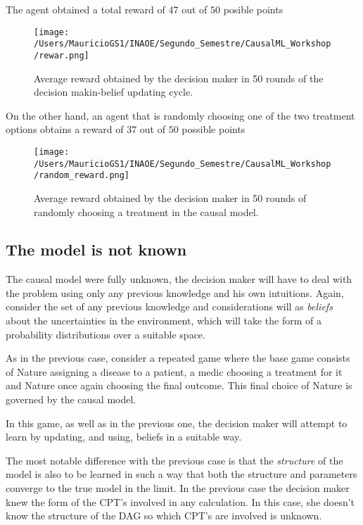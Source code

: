 \documentclass{article}
\begin{document}
The agent obtained a total reward of $47$ out of $50$ posible points
\begin{figure}[ht]
\vskip 0.2in
\begin{center}
\centerline{\texttt{[image: /Users/MauricioGS1/INAOE/Segundo\_Semestre/CausalML\_Workshop/rewar.png]}}
\caption{Average reward obtained by the decision maker in 50 rounds of the decision makin-belief updating cycle.}
\label{average_reward}
\end{center}
\vskip -0.2in
\end{figure}


On the other hand, an agent that is randomly choosing one of the two treatment options obtains a reward of $37$ out of $50$ possible points

\begin{figure}[ht]
\vskip 0.2in
\begin{center}
\centerline{\texttt{[image: /Users/MauricioGS1/INAOE/Segundo\_Semestre/CausalML\_Workshop/random\_reward.png]}}
\caption{Average reward obtained by the decision maker in 50 rounds of randomly choosing a treatment in the causal model.}
\label{random_reward}
\end{center}
\vskip -0.2in
\end{figure}




\subsection{The model is not known}
The causal model were fully unknown, the decision maker will have to deal with the problem using only any previous knowledge and his own intuitions. Again, consider the set of any previous knowledge and considerations will as \textit{beliefs} about the uncertainties in the environment, which will take the form of a probability distributions over a suitable space. 

As in the previous case, consider a repeated game where the base game consists of Nature assigning a disease to a patient, a medic choosing a treatment for it and Nature once again choosing the final outcome. This final choice of Nature is governed by the causal model.

In this game, as well as in the previous one, the decision maker will attempt to learn by updating, and using, beliefs in a suitable way. 

The most notable difference with the previous case is that the \textit{structure} of the model is also to be learned in such a way that both the structure and parameters converge to the true model in the limit. In the previous case the decision maker knew the form of the CPT's involved in any calculation. In this case, she doesn't know the structure of the DAG so which CPT's are involved is unknown.
\end{document}

